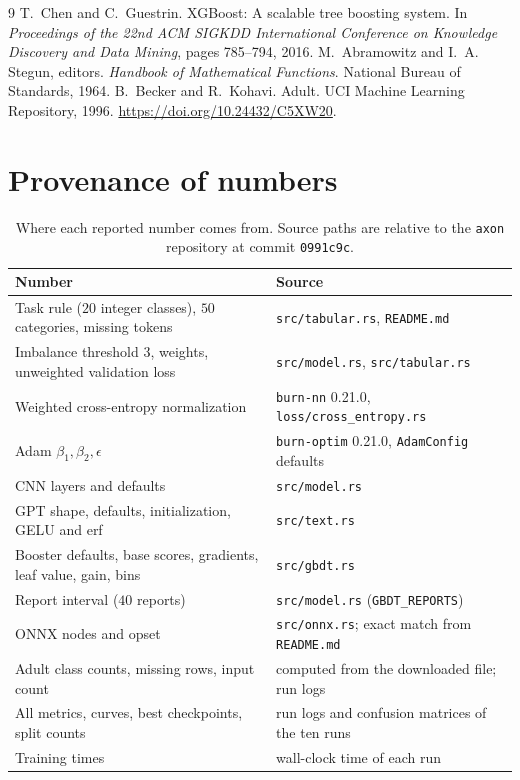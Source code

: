 \documentclass[11pt]{article}
\theoremstyle{plain}
\theoremstyle{definition}
\newcommand{\code}[1]{\texttt{#1}}
\begin{document}
\begin{thebibliography}{9}
 T.~Chen and C.~Guestrin. XGBoost: A scalable tree boosting
  system. In \emph{Proceedings of the 22nd ACM SIGKDD International Conference
  on Knowledge Discovery and Data Mining}, pages 785--794, 2016.
 M.~Abramowitz and I.~A. Stegun, editors. \emph{Handbook of
  Mathematical Functions}. National Bureau of Standards, 1964.
 B.~Becker and R.~Kohavi. Adult. UCI Machine Learning
  Repository, 1996. \url{https://doi.org/10.24432/C5XW20}.
\end{thebibliography}

\appendix
\section{Provenance of numbers}\label{app:provenance}

\begin{table}[htbp]
\centering
\caption{Where each reported number comes from. Source paths are relative to
the \code{axon} repository at commit \code{0991c9c}.}
\label{tab:provenance}
\small
\begin{tabular}{>{\raggedright\arraybackslash}p{} >{\raggedright\arraybackslash}p{}}
\toprule
Number & Source \\
\midrule
Task rule ($20$ integer classes), $50$ categories, missing tokens & \code{src/tabular.rs}, \code{README.md} \\
Imbalance threshold $3$, weights, unweighted validation loss & \code{src/model.rs}, \code{src/tabular.rs} \\
Weighted cross-entropy normalization & \code{burn-nn} 0.21.0, \code{loss/cross\_entropy.rs} \\
Adam $\beta_1, \beta_2, \epsilon$ & \code{burn-optim} 0.21.0, \code{AdamConfig} defaults \\
CNN layers and defaults & \code{src/model.rs} \\
GPT shape, defaults, initialization, GELU and erf & \code{src/text.rs} \\
Booster defaults, base scores, gradients, leaf value, gain, bins & \code{src/gbdt.rs} \\
Report interval ($40$ reports) & \code{src/model.rs} (\code{GBDT\_REPORTS}) \\
ONNX nodes and opset & \code{src/onnx.rs}; exact match from \code{README.md} \\
Adult class counts, missing rows, input count & computed from the downloaded file; run logs \\
All metrics, curves, best checkpoints, split counts & run logs and confusion matrices of the ten runs \\
Training times & wall-clock time of each run \\
\bottomrule
\end{tabular}
\end{table}
\end{document}
